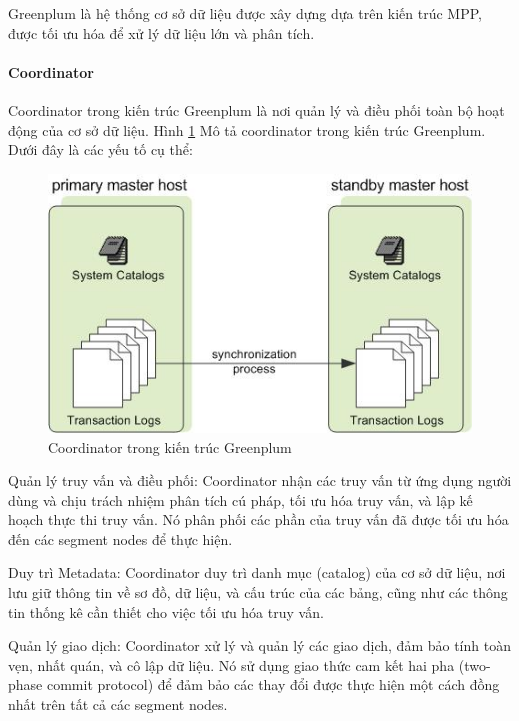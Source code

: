 \documentclass{article}[14pt]
\begin{document}
Greenplum là hệ thống cơ sở dữ liệu được xây dựng dựa trên kiến
trúc MPP, được tối ưu hóa để xử lý dữ liệu lớn và phân tích.


\paragraph{Coordinator}

Coordinator trong kiến trúc Greenplum là nơi quản lý và điều phối
toàn bộ hoạt động của cơ sở dữ liệu. Hình \ref{fig:admin_guide-graphics-standby_coordinator} Mô tả coordinator trong kiến trúc Greenplum.
Dưới đây là các yếu tố cụ thể:


\begin{figure}[htbp]
\centerline{\includegraphics[scale=.7]{images/admin_guide-graphics-standby_coordinator.jpg}}
\captionsetup{font=Large}
\caption{Coordinator trong kiến trúc Greenplum \protect\footnotemark}
\label{fig:admin_guide-graphics-standby_coordinator}
\end{figure}

Quản lý truy vấn và điều phối: Coordinator nhận các truy vấn từ ứng dụng người dùng và chịu trách nhiệm phân tích cú pháp, tối ưu hóa truy vấn, và lập kế hoạch thực thi truy vấn. Nó phân phối các phần của truy vấn đã được tối ưu hóa đến các segment nodes để thực hiện.


Duy trì Metadata: Coordinator duy trì danh mục (catalog) của cơ sở dữ liệu, nơi lưu giữ thông tin về sơ đồ, dữ liệu, và cấu trúc của các bảng, cũng như các thông tin thống kê cần thiết cho việc tối ưu hóa truy vấn.

Quản lý giao dịch: Coordinator xử lý và quản lý các giao dịch, đảm bảo tính toàn vẹn, nhất quán, và cô lập dữ liệu. Nó sử dụng giao thức cam kết hai pha (two-phase commit protocol) để đảm bảo các thay đổi được thực hiện một cách đồng nhất trên tất cả các segment nodes.
\end{document}
